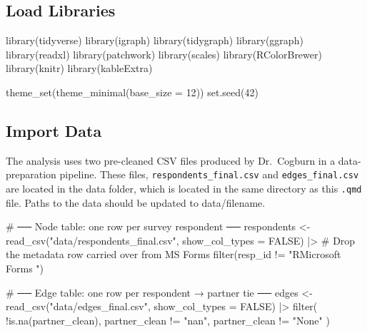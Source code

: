 \documentclass[
  letterpaper,
  DIV=11,
  numbers=noendperiod]{scrartcl}
\newenvironment{Shaded}{\begin{snugshade}}{\end{snugshade}}
\newcommand{\AttributeTok}[1]{\textcolor[rgb]{0.40,0.45,0.13}{#1}}
\newcommand{\CommentTok}[1]{\textcolor[rgb]{0.37,0.37,0.37}{#1}}
\newcommand{\ConstantTok}[1]{\textcolor[rgb]{0.56,0.35,0.01}{#1}}
\newcommand{\DecValTok}[1]{\textcolor[rgb]{0.68,0.00,0.00}{#1}}
\newcommand{\FunctionTok}[1]{\textcolor[rgb]{0.28,0.35,0.67}{#1}}
\newcommand{\NormalTok}[1]{\textcolor[rgb]{0.00,0.23,0.31}{#1}}
\newcommand{\OtherTok}[1]{\textcolor[rgb]{0.00,0.23,0.31}{#1}}
\newcommand{\SpecialCharTok}[1]{\textcolor[rgb]{0.37,0.37,0.37}{#1}}
\newcommand{\StringTok}[1]{\textcolor[rgb]{0.13,0.47,0.30}{#1}}
\begin{document}
\subsection{Load Libraries}\label{load-libraries}

\begin{Shaded}
\begin{Highlighting}[]
\FunctionTok{library}\NormalTok{(tidyverse)}
\FunctionTok{library}\NormalTok{(igraph)}
\FunctionTok{library}\NormalTok{(tidygraph)}
\FunctionTok{library}\NormalTok{(ggraph)}
\FunctionTok{library}\NormalTok{(readxl)}
\FunctionTok{library}\NormalTok{(patchwork)}
\FunctionTok{library}\NormalTok{(scales)}
\FunctionTok{library}\NormalTok{(RColorBrewer)}
\FunctionTok{library}\NormalTok{(knitr)}
\FunctionTok{library}\NormalTok{(kableExtra)}

\FunctionTok{theme\_set}\NormalTok{(}\FunctionTok{theme\_minimal}\NormalTok{(}\AttributeTok{base\_size =} \DecValTok{12}\NormalTok{))}
\FunctionTok{set.seed}\NormalTok{(}\DecValTok{42}\NormalTok{)}
\end{Highlighting}
\end{Shaded}

\subsection{Import Data}\label{import-data}

The analysis uses two pre-cleaned CSV files produced by Dr.~Cogburn in a
data-preparation pipeline. These files, \texttt{respondents\_final.csv}
and \texttt{edges\_final.csv} are located in the data folder, which is
located in the same directory as this \texttt{.qmd} file. Paths to the
data should be updated to data/filename.

\begin{Shaded}
\begin{Highlighting}[]
\CommentTok{\# ── Node table: one row per survey respondent ──}
\NormalTok{respondents }\OtherTok{\textless{}{-}} \FunctionTok{read\_csv}\NormalTok{(}\StringTok{"data/respondents\_final.csv"}\NormalTok{, }\AttributeTok{show\_col\_types =} \ConstantTok{FALSE}\NormalTok{) }\SpecialCharTok{|\textgreater{}}
  \CommentTok{\# Drop the metadata row carried over from MS Forms}
\FunctionTok{filter}\NormalTok{(resp\_id }\SpecialCharTok{!=} \StringTok{"RMicrosoft Forms "}\NormalTok{)}

\CommentTok{\# ── Edge table: one row per respondent → partner tie ──}
\NormalTok{edges }\OtherTok{\textless{}{-}} \FunctionTok{read\_csv}\NormalTok{(}\StringTok{"data/edges\_final.csv"}\NormalTok{, }\AttributeTok{show\_col\_types =} \ConstantTok{FALSE}\NormalTok{) }\SpecialCharTok{|\textgreater{}}
  \FunctionTok{filter}\NormalTok{(}
    \SpecialCharTok{!}\FunctionTok{is.na}\NormalTok{(partner\_clean),}
\NormalTok{    partner\_clean }\SpecialCharTok{!=} \StringTok{"nan"}\NormalTok{,}
\NormalTok{    partner\_clean }\SpecialCharTok{!=} \StringTok{"None"}
\NormalTok{  )}
\end{Highlighting}
\end{Shaded}
\end{document}
